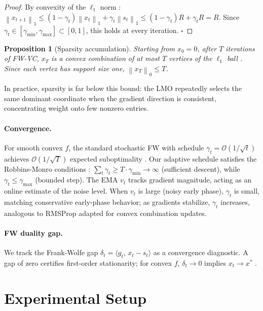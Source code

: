 \documentclass[10pt,twocolumn]{article}
\newtheorem{proposition}{Proposition}
\newcommand{\norm}[1]{\left\|#1\right\|}
\newcommand{\inner}[2]{\langle #1,\, #2 \rangle}
\begin{document}
\begin{proof}
By convexity of the $\ell_1$ norm \cite{boyd2004}:
\(
\norm{x_{t+1}}_1 \leq (1-\gamma_t)\norm{x_t}_1 + \gamma_t\norm{s_t}_1
\leq (1-\gamma_t)R + \gamma_t R = R.
\)
Since $\gamma_t \in [\gamma_{\min}, \gamma_{\max}] \subset [0,1]$,
this holds at every iteration. $\square$
\end{proof}

\begin{proposition}[Sparsity accumulation]
\label{prop:sparsity}
Starting from $x_0 = 0$, after $T$ iterations of FW-VC, $x_T$ is a
convex combination of at most $T$ vertices of the $\ell_1$ ball
\cite{jaggi2013}. Since each vertex has support size one,
$\norm{x_T}_0 \leq T$.
\end{proposition}

In practice, sparsity is far below this bound: the LMO repeatedly selects
the same dominant coordinate when the gradient direction is consistent,
concentrating weight onto few nonzero entries.

\paragraph{Convergence.}
For smooth convex $f$, the standard stochastic FW with schedule
$\gamma_t = \mathcal{O}(1/\sqrt{t})$ achieves $\mathcal{O}(1/\sqrt{T})$
expected suboptimality \cite{hazan2012}. Our adaptive schedule satisfies
the Robbins-Monro conditions \cite{robbins1951}: $\sum_t \gamma_t \geq
T\cdot\gamma_{\min} \to \infty$ (sufficient descent), while
$\gamma_t \leq \gamma_{\max}$ (bounded step). The EMA $v_t$ tracks
gradient magnitude, acting as an online estimate of the noise level.
When $v_t$ is large (noisy early phase), $\gamma_t$ is small, matching
conservative early-phase behavior; as gradients stabilize, $\gamma_t$
increases, analogous to RMSProp \cite{tieleman2012} adapted for convex
combination updates.

\paragraph{FW duality gap.}
We track the Frank-Wolfe gap $\delta_t = \inner{g_t}{x_t - s_t}$ as a
convergence diagnostic. A gap of zero certifies first-order stationarity;
for convex $f$, $\delta_t \to 0$ implies $x_t \to x^*$ \cite{jaggi2013}.


\section{Experimental Setup}
\label{sec:setup}
\end{document}
